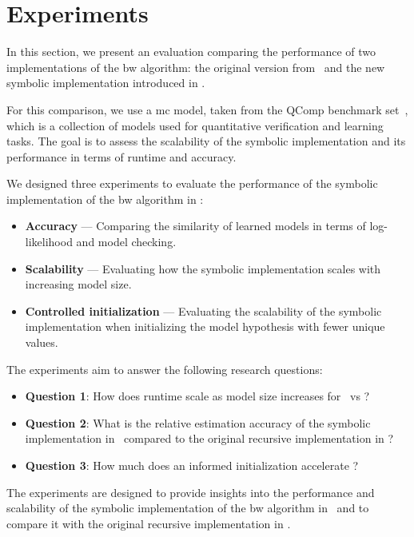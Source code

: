 \section{Experiments}\label{sec:experiments}
In this section, we present an evaluation comparing the performance of two implementations of the \gls{bw} algorithm: the original version from \Jajapy\ and the new symbolic implementation introduced in \Cupaal.

For this comparison, we use a \gls{mc} model, taken from the QComp benchmark set~\cite{hartmanns2019quantitative}, which is a collection of models used for quantitative verification and learning tasks.
The goal is to assess the scalability of the symbolic implementation and its performance in terms of runtime and accuracy.

We designed three experiments to evaluate the performance of the symbolic implementation of the \gls{bw} algorithm in \Cupaal:

\begin{itemize}
    \item \textbf{Accuracy} — Comparing the similarity of learned models in terms of log-likelihood and model checking.
    \item \textbf{Scalability} — Evaluating how the symbolic implementation scales with increasing model size.
    \item \textbf{Controlled initialization} — Evaluating the scalability of the symbolic implementation when initializing the model hypothesis with fewer unique values.
\end{itemize}

The experiments aim to answer the following research questions:
\begin{itemize}
    \item \textbf{Question 1}: How does runtime scale as model size increases for \Cupaal\ vs \Jajapy?
    \item \textbf{Question 2}: What is the relative estimation accuracy of the symbolic implementation in \Cupaal\ compared to the original recursive implementation in \Jajapy?
    \item \textbf{Question 3}: How much does an informed initialization accelerate \Cupaal?
\end{itemize}


The experiments are designed to provide insights into the performance and scalability of the symbolic implementation of the \gls{bw} algorithm in \Cupaal\ and to compare it with the original recursive implementation in \Jajapy.


